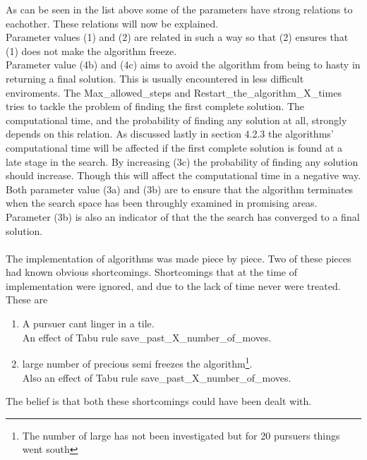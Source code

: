 \begin{enumerate}
\end{enumerate} 
As can be seen in the list above some of the parameters have strong relations to eachother. These relations will now be explained. \\
Parameter values (1) and (2) are related in such a way so that (2) ensures that (1) does not make the algorithm freeze. \\
Parameter value (4b) and (4c) aims to avoid the algorithm from being to hasty in returning a final solution. This is usually encountered in less difficult enviroments. The Max\_allowed\_steps and Restart\_the\_algorithm\_X\_times tries to tackle the problem of finding the first complete solution. The computational time, and the probability of finding any solution at all, strongly depends on this relation. As discussed lastly in section 4.2.3 the algorithms' computational time will be affected if the first complete solution is found at a late stage in the search. By increasing (3c) the probability of finding any solution should increase. Though this will affect the computational time in a negative way. Both parameter value (3a) and (3b) are to ensure that the algorithm terminates when the search space has been throughly examined in promising areas.
Parameter (3b) is also an indicator of that the the search has converged to a final solution.\\
\\
The implementation of algorithms was made piece by piece. Two of these pieces had known obvious shortcomings. Shortcomings that at the time of implementation were ignored, and due to the lack of time never were treated. These are\\
\begin{enumerate}
\item{} A pursuer cant linger in a tile. \vspace{0,1cm}\\
 An effect of Tabu rule save\_past\_X\_number\_of\_moves.
\item{} large number of precious semi freezes the algorithm\footnote{ The number of large has not been investigated but for 20 pursuers things went south }. \vspace{0,1cm}\\
Also an effect of Tabu rule save\_past\_X\_number\_of\_moves.
\end{enumerate} 
The belief is that both these shortcomings could have been dealt with.

